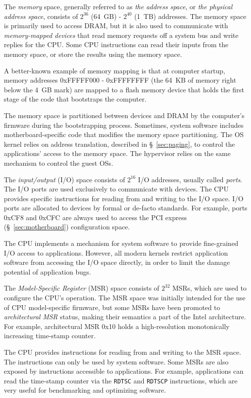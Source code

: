 The \textit{memory} space, generally referred to as \textit{the address space},
or \textit{the physical address space}, consists of $2^{36}$ (64~GB) - $2^{40}$
(1~TB) addresses. The memory space is primarily used to access DRAM, but it is
also used to communicate with \textit{memory-mapped devices} that read memory
requests off a system bus and write replies for the CPU. Some CPU instructions
can read their inputs from the memory space, or store the results using the
memory space.

A better-known example of memory mapping is that at computer startup, memory
addresses 0xFFFFF000 - 0xFFFFFFFF (the 64~KB of memory right below the 4~GB
mark) are mapped to a flash memory device that holds the first stage of the
code that bootstraps the computer.

The memory space is partitioned between devices and DRAM by the computer's
firmware during the bootstrapping process. Sometimes, system software includes
motherboard-specific code that modifies the memory space partitioning. The OS
kernel relies on address translation, described in \S~\ref{sec:paging}, to
control the applications' access to the memory space. The hypervisor relies on
the same mechanism to control the guest OSs.


The \textit{input/output} (I/O) space consists of $2^{16}$ I/O addresses,
usually called \textit{ports}. The I/O ports are used exclusively to
communicate with devices. The CPU provides specific instructions for reading
from and writing to the I/O space. I/O ports are allocated to devices by formal
or de-facto standards. For example, ports 0xCF8 and 0xCFC are always used to
access the PCI express (\S~\ref{sec:motherboard}) configuration space.

The CPU implements a mechanism for system software to provide fine-grained I/O
access to applications. However, all modern kernels restrict application
software from accessing the I/O space directly, in order to limit the damage
potential of application bugs.


The \textit{Model-Specific Register} (MSR) space consists of $2^{32}$ MSRs,
which are used to configure the CPU's operation. The MSR space was initially
intended for the use of CPU model-specific firmware, but some MSRs have been
promoted to \textit{architectural MSR} status, making their semantics a part of
the Intel architecture. For example, architectural MSR 0x10 holds a
high-resolution monotonically increasing time-stamp counter.

The CPU provides instructions for reading from and writing to the MSR space.
The instructions can only be used by system software. Some MSRs are also
exposed by instructions accessible to applications. For example, applications
can read the time-stamp counter via the \texttt{RDTSC} and \texttt{RDTSCP}
instructions, which are very useful for benchmarking and optimizing software.
